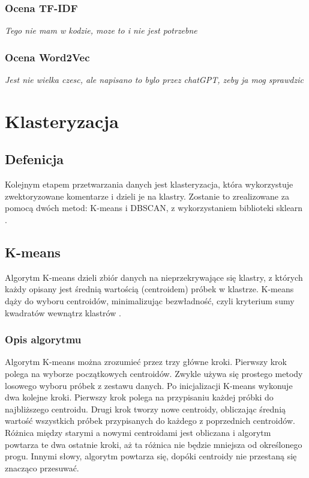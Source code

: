 		\subsubsection{Ocena  TF-IDF}
			\textit{Tego nie mam w kodzie, moze to i nie jest potrzebne}
		
		\subsubsection{Ocena  Word2Vec}
			\textit{Jest nie wielka czesc, ale napisano to bylo przez chatGPT, zeby ja mog sprawdzic}
		
	
\section{Klasteryzacja}

	\subsection{Defenicja}
		Kolejnym etapem przetwarzania danych jest klasteryzacja, która wykorzystuje zwektoryzowane komentarze i dzieli je na klastry. Zostanie to zrealizowane za pomocą dwóch metod: K-means i DBSCAN, z wykorzystaniem biblioteki sklearn \cite{scikit-learn}.  \cite{dbscan}
	
	\subsection{K-means}
 		Algorytm K-means dzieli zbiór danych na nieprzekrywające się klastry, z których każdy opisany jest średnią wartością (centroidem) próbek w klastrze. K-means dąży do wyboru centroidów, minimalizując bezwładność, czyli kryterium sumy kwadratów wewnątrz klastrów \cite{k-means}.
	
		\subsubsection{Opis algorytmu}
			Algorytm K-means można zrozumieć przez trzy główne kroki. Pierwszy krok polega na wyborze początkowych centroidów. Zwykle używa się prostego metody losowego wyboru próbek z zestawu danych. Po inicjalizacji K-means wykonuje dwa kolejne kroki. Pierwszy krok polega na przypisaniu każdej próbki do najbliższego centroidu. Drugi krok tworzy nowe centroidy, obliczając średnią wartość wszystkich próbek przypisanych do każdego z poprzednich centroidów. Różnica między starymi a nowymi centroidami jest obliczana i algorytm powtarza te dwa ostatnie kroki, aż ta różnica nie będzie mniejsza od określonego progu. Innymi słowy, algorytm powtarza się, dopóki centroidy nie przestaną się znacząco przesuwać.

